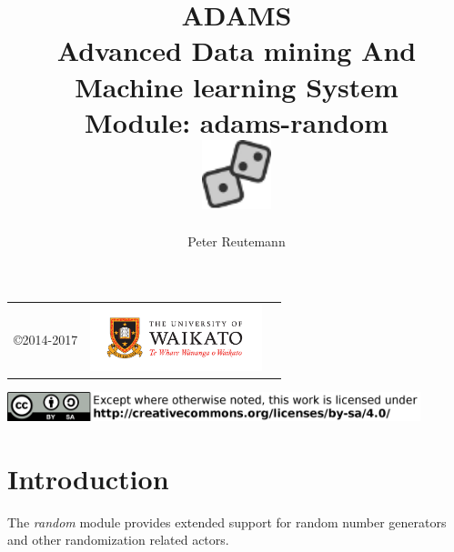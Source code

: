 \documentclass[a4paper]{book}
\title{
  \textbf{ADAMS} \\
  {\Large \textbf{A}dvanced \textbf{D}ata mining \textbf{A}nd \textbf{M}achine
  learning \textbf{S}ystem} \\
  {\Large Module: adams-random} \\
  \vspace{1cm}
  \includegraphics[width=2cm]{images/random-module.png} \\
}
\author{
  Peter Reutemann
}
\begin{document}
\begin{titlepage}
\maketitle

\thispagestyle{empty}
\center
\begin{table}[b]
	\begin{tabular}{c l l}
		\parbox[c][2cm]{2cm}{\copyright 2014-2017} &
		\parbox[c][2cm]{5cm}{\includegraphics[width=5cm]{images/coat_of_arms.pdf}} \\
	\end{tabular}
	\includegraphics[width=12cm]{images/cc.png} \\
\end{table}

\end{titlepage}

\tableofcontents

\chapter{Introduction}
The \textit{random} module provides extended support for random number 
generators and other randomization related actors.

\end{document}
